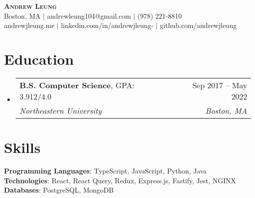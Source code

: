 \documentclass[letterpaper, 11pt]{article}
\makeatletter
\newcommand{\educationSubHeading}[5]{
  \vspace{-2pt}\item
    \begin{tabular*}{0.97\textwidth}[t]{l@{\extracolsep{\fill}}r}
      \textbf{#1}, #2 & #3 \\
     \textit{\small#4} &  \textit{\small#5} \\
    \end{tabular*}\vspace{-7pt}
}
\newcommand{\resumeSubHeadingListStart}{\begin{itemize}[leftmargin=0.15in, label={}]}
\newcommand{\resumeSubHeadingListEnd}{\end{itemize}}
\makeatother
\begin{document}
 
  
\begin{center}
    \textbf{\Large \scshape Andrew Leung} \\ \vspace{1.5pt}
    \small Boston, MA $|$ andrewleung104@gmail.com $|$ (978) 221-8810\\
    \small andrewjleung.me $|$ linkedin.com/in/andrewjleung- $|$ github.com/andrewjleung
\end{center}
\vspace{-15pt}  
  
\section{Education}
  \resumeSubHeadingListStart
    \educationSubHeading
      {B.S. Computer Science}{GPA: 3.912/4.0}{Sep 2017 -- May 2022}
      {Northeastern University}{Boston, MA}
     \vspace{-5pt}
  \resumeSubHeadingListEnd  
  
\section{Skills}
    \begin{itemize}[leftmargin=0.15in, label={}]
        \small{\item{
            \textbf{Programming Languages}{: TypeScript, JavaScript, Python, Java}\\
            \textbf{Technologies}{: React, React Query, Redux, Express.js, Fastify, Jest, NGINX}\\
            \textbf{Databases}{: PostgreSQL, MongoDB}\\
        }}
\end{itemize}  
  
\end{document}
